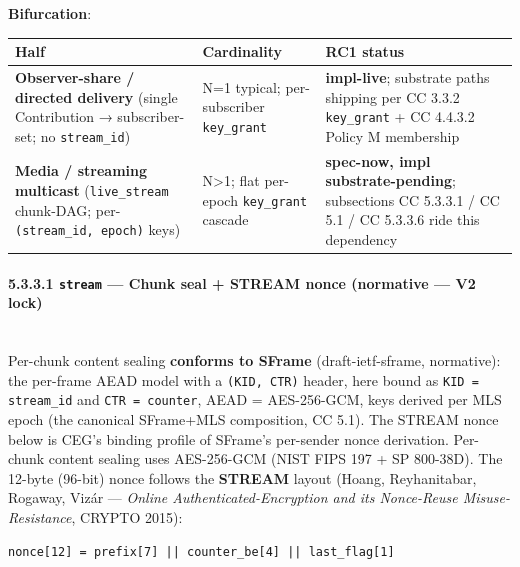 \documentclass[11pt]{article}
\begin{document}
\textbf{Bifurcation}:


{\footnotesize
\begin{longtable}{|p{5.33cm}|p{5.33cm}|p{5.33cm}|}\hline
\textbf{Half} & \textbf{Cardinality} & \textbf{RC1 status} \\ \hline\endhead
\textbf{Observer-share / directed delivery} (single Contribution → subscriber-set; no \texttt{stream\_id}) & N=1 typical; per-subscriber \texttt{key\_grant} & \textbf{impl-live}; substrate paths shipping per CC 3.3.2 \texttt{key\_grant} + CC 4.4.3.2 Policy M membership \\ \hline
\textbf{Media / streaming multicast} (\texttt{live\_stream} chunk-DAG; per-\texttt{(stream\_id, epoch)} keys) & N>1; flat per-epoch \texttt{key\_grant} cascade & \textbf{spec-now, impl substrate-pending}; subsections CC 5.3.3.1 / CC 5.1 / CC 5.3.3.6 ride this dependency \\ \hline
\end{longtable}}


\paragraph{5.3.3.1 \texttt{stream} — Chunk seal + STREAM nonce (normative — V2 lock)}\mbox{}\\


Per-chunk content sealing \textbf{conforms to SFrame} (draft-ietf-sframe, normative): the per-frame AEAD model with a \texttt{(KID, CTR)} header, here bound as \texttt{KID = stream\_id} and \texttt{CTR = counter}, AEAD = AES-256-GCM, keys derived per MLS epoch (the canonical SFrame+MLS composition, CC 5.1). The STREAM nonce below is CEG's binding profile of SFrame's per-sender nonce derivation. Per-chunk content sealing uses AES-256-GCM (NIST FIPS 197 + SP 800-38D). The 12-byte (96-bit) nonce follows the \textbf{STREAM} layout (Hoang, Reyhanitabar, Rogaway, Vizár — \textit{Online Authenticated-Encryption and its Nonce-Reuse Misuse-Resistance}, CRYPTO 2015):


\begin{lstlisting}
nonce[12] = prefix[7] || counter_be[4] || last_flag[1]
\end{lstlisting}
\end{document}
